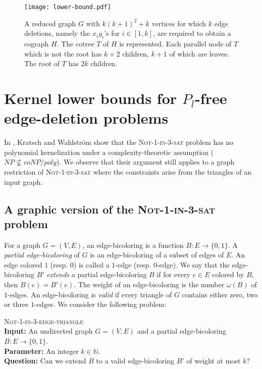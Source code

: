 \documentclass[11pt]{article}
\begin{document}
\begin{figure}[ht]
\centerline{\texttt{[image: lower-bound.pdf]}}
\caption{A reduced graph $G$ with $k(k+1)^2+k$ vertices for which $k$ edge deletions, namely the $x_iy_i$'s for $i\in[1,k]$, are required to obtain a cograph $H$. The cotree $T$ of $H$ is represented. Each parallel node of $T$  which is not the root has $k+2$ children, $k+1$ of which are leaves. The root of $T$ has $2k$ children.
\label{fig:lower-bound}}
\end{figure}

\section{Kernel lower bounds for $P_l$-free edge-deletion problems}
\label{sec:lower}

\newcommand{\notone}{\textsc{Not-1-in-3-sat}}

In \cite{KW09}, Kratsch and Wahlstr\"om show that the \notone{} problem has no polynomial kernelization under a complexity-theoretic assumption ($NP \nsubseteq coNP / poly$).
We observe that their argument still applies to a graph restriction of \notone{} where the constraints arise from the triangles of an input graph. 

\subsection{A graphic version of the {\sc\notone{}} problem}


For a graph $G=(V,E)$, an edge-bicoloring is a function $B: E \rightarrow \{0,1\}$. A \emph{partial edge-bicoloring} of $G$ is an edge-bicoloring of a subset of edges of $E$. An edge colored $1$ (resp. $0$) is called a $1$-edge (resp. $0$-edge). We say that the edge-bicoloring $B'$ \emph{extends} a partial edge-bicoloring $B$ if for every $e\in E$ colored by $B$, then $B(e)=B'(e)$.
The weight of an edge-bicoloring is the number $\omega(B)$ of $1$-edges. An edge-bicoloring is \emph{valid} if  every triangle of $G$ contains either zero, two or three $1$-edges. We consider the following problem:

\medskip
\noindent
\textsc{Not-1-in-3-edge-triangle}\\
\textbf{Input:} An undirected graph $G=(V,E)$ and a partial edge-bicoloring $B: E \rightarrow \{0,1\}$.\\
\textbf{Parameter:} An integer $k\in\mathbb{N}$.\\
\textbf{Question:} Can we extend $B$ to a valid edge-bicoloring $B'$ of weight at most $k$?
\end{document}
